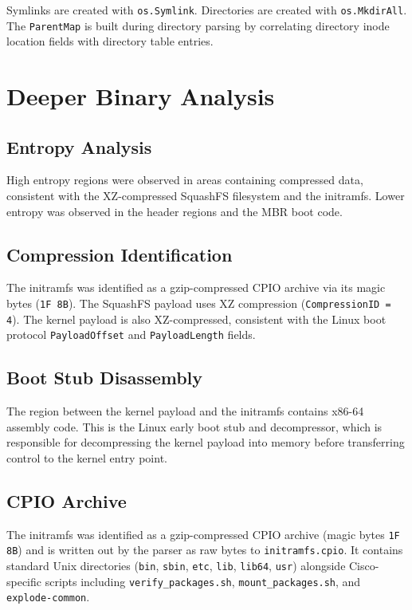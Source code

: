 \documentclass[11pt,a4paper]{article}
\begin{document}
Symlinks are created with \texttt{os.Symlink}. Directories are created
with \texttt{os.MkdirAll}. The \texttt{ParentMap} is built during
directory parsing by correlating directory inode location fields with
directory table entries.

\section{Deeper Binary Analysis}

\subsection{Entropy Analysis}
High entropy regions were observed in areas containing compressed data,
consistent with the XZ-compressed SquashFS filesystem and the initramfs.
Lower entropy was observed in the header regions and the MBR boot code.

\subsection{Compression Identification}
The initramfs was identified as a gzip-compressed CPIO archive via its
magic bytes (\texttt{1F 8B}). The SquashFS payload uses XZ compression
(\texttt{CompressionID = 4}). The kernel payload is also XZ-compressed,
consistent with the Linux boot protocol \texttt{PayloadOffset} and
\texttt{PayloadLength} fields.

\subsection{Boot Stub Disassembly}
The region between the kernel payload and the initramfs contains x86-64
assembly code. This is the Linux early boot stub and decompressor, which
is responsible for decompressing the kernel payload into memory before
transferring control to the kernel entry point.

\subsection{CPIO Archive}
The initramfs was identified as a gzip-compressed CPIO archive
(magic bytes \texttt{1F 8B}) and is written out by the parser as raw
bytes to \texttt{initramfs.cpio}. It contains standard Unix directories
(\texttt{bin}, \texttt{sbin}, \texttt{etc}, \texttt{lib},
\texttt{lib64}, \texttt{usr}) alongside Cisco-specific scripts including
\texttt{verify\_packages.sh}, \texttt{mount\_packages.sh}, and
\texttt{explode-common}.
\end{document}

